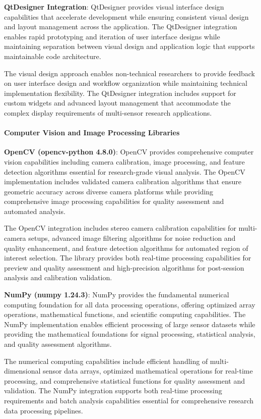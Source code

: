 \documentclass[12pt,a4paper]{report}
\begin{document}
\textbf{QtDesigner Integration}: QtDesigner provides visual interface design capabilities that accelerate development while
ensuring consistent visual design and layout management across the application. The QtDesigner integration enables rapid
prototyping and iteration of user interface designs while maintaining separation between visual design and application
logic that supports maintainable code architecture.

The visual design approach enables non-technical researchers to provide feedback on user interface design and workflow
organization while maintaining technical implementation flexibility. The QtDesigner integration includes support for
custom widgets and advanced layout management that accommodate the complex display requirements of multi-sensor research
applications.

\paragraph{Computer Vision and Image Processing Libraries}

\textbf{OpenCV (opencv-python 4.8.0)}: OpenCV provides comprehensive computer vision capabilities including camera
calibration, image processing, and feature detection algorithms essential for research-grade visual analysis. The OpenCV
implementation includes validated camera calibration algorithms that ensure geometric accuracy across diverse camera
platforms while providing comprehensive image processing capabilities for quality assessment and automated analysis.

The OpenCV integration includes stereo camera calibration capabilities for multi-camera setups, advanced image filtering
algorithms for noise reduction and quality enhancement, and feature detection algorithms for automated region of
interest selection. The library provides both real-time processing capabilities for preview and quality assessment and
high-precision algorithms for post-session analysis and calibration validation.

\textbf{NumPy (numpy 1.24.3)}: NumPy provides the fundamental numerical computing foundation for all data processing
operations, offering optimized array operations, mathematical functions, and scientific computing capabilities. The
NumPy implementation enables efficient processing of large sensor datasets while providing the mathematical foundations
for signal processing, statistical analysis, and quality assessment algorithms.

The numerical computing capabilities include efficient handling of multi-dimensional sensor data arrays, optimized
mathematical operations for real-time processing, and comprehensive statistical functions for quality assessment and
validation. The NumPy integration supports both real-time processing requirements and batch analysis capabilities
essential for comprehensive research data processing pipelines.
\end{document}
